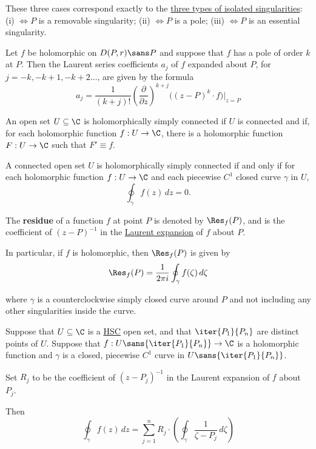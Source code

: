 These three cases correspond exactly to the \href{a7f062e}{three types of
isolated singularities}: (i) $\iff P$ is a removable singularity; (ii) $\iff P$
is a pole; (iii) $\iff P$ is an essential singularity.

\Proposition{}\label{c1d2d0c}

Let $f$ be holomorphic on $D(P,r)\sans P$ and suppose that $f$ has a pole of
order $k$ at $P$. Then the Laurent series coefficients $a_j$ of $f$ expanded
about $P$, for $j=-k,-k+1,-k+2\ldots$, are given by the formula
$$
  a_j=\frac1{(k+j)!}\left(\frac\partial{\partial z}\right)^{k+j}
  \bigl((z-P)^k\cdot f\bigr)\Bigg|_{z=P}
$$

\label{d20898f}

An open set $U\subseteq\C$ is holomorphically simply connected if $U$ is
connected and if, for each holomorphic function $f:U\to\C$, there is a
holomorphic function $F:U\to\C$ such that $F'\equiv f$.

\Lemma{}\label{f3a867e}

A connected open set $U$ is holomorphically simply connected if and only if for
each holomorphic function $f:U\to\C$ and each piecewise $C^1$ closed curve
$\gamma$ in $U$,
$$
  \oint_\gamma f(z)\,dz=0.
$$

\label{ea3ff58}

The \textbf{residue} of a function $f$ at point $P$ is denoted by $\Res_f(P)$,
and is the coefficient of $(z-P)^{-1}$ in the \href{e7fa5f8}{Laurent expansion}
of $f$ about $P$.

In particular, if $f$ is holomorphic, then $\Res_f(P)$ is given by
$$
  \Res_f(P)=\frac1{2\pi i}\oint_\gamma f(\zeta)\,d\zeta
$$

where $\gamma$ is a counterclockwise simply closed curve around $P$ and not
including any other singularities inside the curve.

\label{e1efb5a}

Suppose that $U\subseteq\C$ is a \href{d20898f}{HSC} open set, and that
$\iter{P_1}{P_n}$ are distinct points of $U$. Suppose that
$f:U\sans{\iter{P_1}{P_n}}\to\C$ is a holomorphic function and $\gamma$ is a
closed, piecewise $C^1$ curve in $U\sans{\iter{P_1}{P_n}}$.

Set $R_j$ to be the coefficient of $(z-P_j)^{-1}$ in the Laurent expansion of
$f$ about $P_j$.

Then
$$
  \oint_\gamma f(z)\,dz=\sum_{j=1}^nR_j\cdot\left(\oint_\gamma\frac1{\zeta-P_j}\,d\zeta\right)
$$

